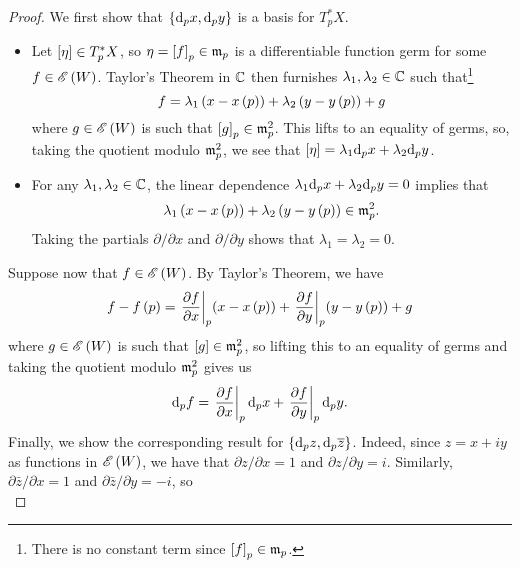 \documentclass[../Moduli_Spaces_of_Riemann_Surfaces.tex]{subfiles}
\begin{document}
    \begin{proof}
        We first show that $\left\{\mathrm{d}_px,\mathrm{d}_py\right\}$ is a basis for $T_p^\ast X$.
        \begin{itemize}
            \item Let $\left[\eta\right]\in T_p^\ast X$, so $\eta=\left[f\right]_p\in\mathfrak{m}_p$ is a differentiable function germ for some $f\in\mathscr{E}\left(W\right)$. Taylor's Theorem in $\mathbb{C}$ then furnishes $\lambda_1,\lambda_2\in\mathbb{C}$ such that\footnote{There is no constant term since $\left[f\right]_p\in\mathfrak{m}_p$.}
                \begin{equation*}
                    f=\lambda_1\left(x-x\left(p\right)\right)+\lambda_2\left(y-y\left(p\right)\right)+g
                \end{equation*}
                where $g\in\mathscr{E}\left(W\right)$ is such that $\left[g\right]_p\in\mathfrak{m}^2_p$. This lifts to an equality of germs, so, taking the quotient modulo $\mathfrak{m}^2_p$, we see that $\left[\eta\right]=\lambda_1\mathrm{d}_px+\lambda_2\mathrm{d}_py$.
            \item For any $\lambda_1,\lambda_2\in\mathbb{C}$, the linear dependence $\lambda_1\mathrm{d}_px+\lambda_2\mathrm{d}_py=0$ implies that
                \begin{equation*}
                    \lambda_1\left(x-x\left(p\right)\right)+\lambda_2\left(y-y\left(p\right)\right)\in\mathfrak{m}^2_p.
                \end{equation*}
                Taking the partials $\partial/\partial x$ and $\partial/\partial y$ shows that $\lambda_1=\lambda_2=0$.
        \end{itemize}
        Suppose now that $f\in\mathscr{E}\left(W\right)$. By Taylor's Theorem, we have
        \begin{equation*}
            f-f\left(p\right)=\left.\frac{\partial f}{\partial x}\right|_p\!\left(x-x\left(p\right)\right)+\left.\frac{\partial f}{\partial y}\right|_p\!\left(y-y\left(p\right)\right)+g
        \end{equation*}
        where $g\in\mathscr{E}\left(W\right)$ is such that $\left[g\right]\in\mathfrak{m}^2_p$, so lifting this to an equality of germs and taking the quotient modulo $\mathfrak{m}^2_p$ gives us
        \begin{equation*}
            \mathrm{d}_pf=\left.\frac{\partial f}{\partial x}\right|_p\mathrm{d}_px+\left.\frac{\partial f}{\partial y}\right|_p\mathrm{d}_py.
        \end{equation*}
        Finally, we show the corresponding result for $\left\{\mathrm{d}_pz,\mathrm{d}_p\overline{z}\right\}$. Indeed, since $z=x+iy$ as functions in $\mathscr{E}\left(W\right)$, we have that $\partial z/\partial x=1$ and $\partial z/\partial y=i$. Similarly, $\partial\bar{z}/\partial x=1$ and $\partial\bar{z}/\partial y=-i$, so
        \begin{equation*}

\end{equation*}
\end{proof}
\end{document}

